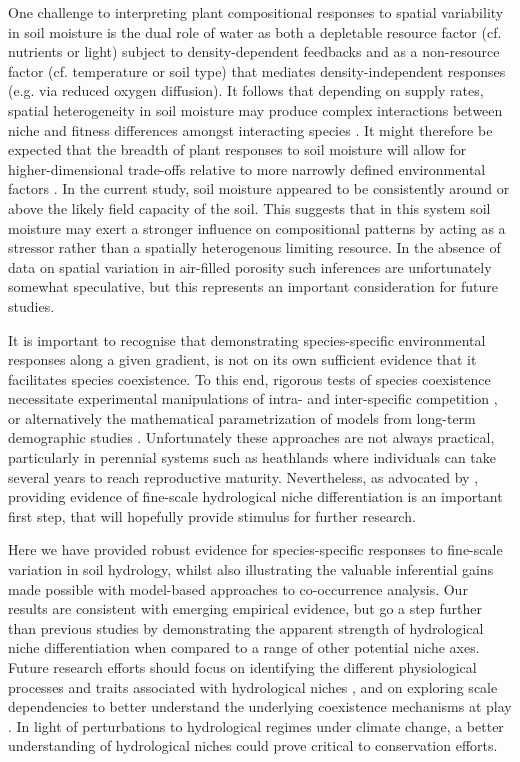 One challenge to interpreting plant compositional responses to spatial variability in soil moisture is the dual role of water as both a depletable resource factor (cf. nutrients or light) subject to density-dependent feedbacks and as a non-resource factor (cf. temperature or soil type) that mediates density-independent responses (e.g. via reduced oxygen diffusion). It follows that depending on supply rates, spatial heterogeneity in soil moisture may produce complex interactions between niche and fitness differences amongst interacting species \citep[\textit{sensu}][]{Chesson2000}. It might therefore be expected that the breadth of plant responses to soil moisture will allow for higher-dimensional trade-offs relative to more narrowly defined environmental factors \citep{tilman1982, Chase2003}. In the current study, soil moisture appeared to be consistently around or above the likely field capacity of the soil. This suggests that in this system soil moisture may exert a stronger influence on compositional patterns by acting as a stressor rather than a spatially heterogenous limiting resource. In the absence of data on spatial variation in air-filled porosity such inferences are unfortunately somewhat speculative, but this represents an important consideration for future studies.

It is important to recognise that demonstrating species-specific environmental responses along a given gradient, is not on its own sufficient evidence that it facilitates species coexistence. To this end, rigorous tests of species coexistence necessitate experimental manipulations of intra- and inter-specific competition \citep[e.g.][]{Levine2002, Sears2007a, Godoy2014}, or alternatively the mathematical parametrization of models from long-term demographic studies \citep[e.g.][]{Adler2006, Angert2009}. Unfortunately these approaches are not always practical, particularly in perennial systems such as heathlands where individuals can take several years to reach reproductive maturity. Nevertheless, as advocated by \citep{Silvertown2015}, providing evidence of fine-scale hydrological niche differentiation is an important first step, that will hopefully provide stimulus for further research.

Here we have provided robust evidence for species-specific responses to fine-scale variation in soil hydrology, whilst also illustrating the valuable inferential gains made possible with model-based approaches to co-occurrence analysis. Our results are consistent with emerging empirical evidence, but go a step further than previous studies by demonstrating the apparent strength of hydrological niche differentiation when compared to a range of other potential niche axes. Future research efforts should focus on identifying the different physiological processes and traits associated with hydrological niches \citep{Silvertown2015}, and on exploring scale dependencies to better understand the underlying coexistence mechanisms at play \cite{Adler2013}. In light of perturbations to hydrological regimes under climate change, a better understanding of hydrological niches could prove critical to conservation efforts.


